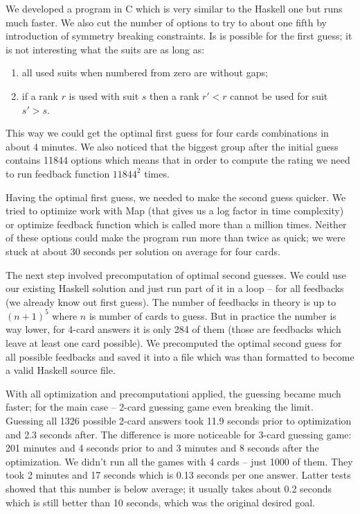 \documentclass{article}
\begin{document}
We developed a program in C which is very similar to the Haskell one but runs much faster.
We also cut the number of options to try to about one fifth by introduction of symmetry breaking constraints.
Is is possible for the first guess; it is not interesting what the suits are as long as:
\begin{enumerate}
\item all used suits when numbered from zero are without gaps;
\item if a rank $r$ is used with suit $s$ then a rank $r' < r$ cannot be used for suit $s' > s$.
\end{enumerate}
This way we could get the optimal first guess for four cards combinations in about 4 minutes.
We also noticed that the biggest group after the initial guess contains 11844 options which means that in order to compute the rating we need to run feedback function $11844^2$ times.

Having the optimal first guess, we needed to make the second guess quicker.
We tried to optimize work with Map (that gives us a log factor in time complexity) or optimize feedback function which is called more than a million times.
Neither of these options could make the program run more than twice as quick; we were stuck at about 30 seconds per solution on average for four cards.

The next step involved precomputation of optimal second guesses.
We could use our existing Haskell solution and just run part of it in a loop -- for all feedbacks (we already know out first guess).
The number of feedbacks in theory is up to $(n+1)^5$ where $n$ is number of cards to guess.
But in practice the number is way lower, for 4-card answers it is only 284 of them (those are feedbacks which leave at least one card possible).
We precomputed the optimal second guess for all possible feedbacks and saved it into a file which was than formatted to become a valid Haskell source file.

With all optimization and precomputationi applied, the guessing became much faster; for the main case -- 2-card guessing game even breaking the limit.
Guessing all 1326 possible 2-card answers took 11.9 seconds prior to optimization and 2.3 seconds after.
The difference is more noticeable for 3-card guessing game: 201 minutes and 4 seconds prior to and 3 minutes and 8 seconds after the optimization.
We didn't run all the games with 4 cards -- just 1000 of them.
They took 2 minutes and 17 seconds which is 0.13 seconds per one answer.
Latter tests showed that this number is below average; it usually takes about 0.2 seconds which is still better than 10 seconds, which was the original desired goal.
\end{document}

